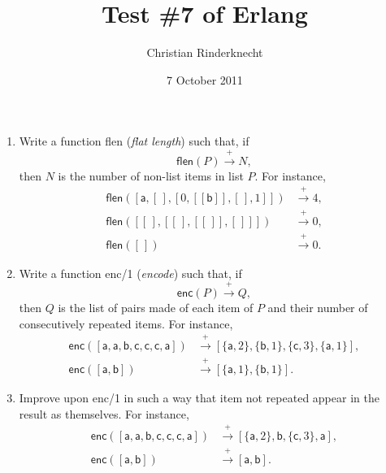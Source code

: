 \documentclass[11pt,a4paper]{article}
\title{Test \#7 of \textsf{Erlang}}
\author{Christian Rinderknecht}
\date{7 October 2011}
\newcommand\fun[1]{\textsf{#1}}
\begin{document}
\maketitle

\thispagestyle{empty}


\begin{enumerate}

  \item Write a function \fun{flen} (\emph{flat length}) such that, if
    \[\fun{flen}(P) \xrightarrow{+} N,\]
    then \(N\) is the number of non-list items in list \(P\). For
    instance,
    \begin{align*}
    \fun{flen}([\fun{a},[\,],[0,[[\fun{b}]],[\,],1]])
    &\xrightarrow{+} 4,\\
    \fun{flen}([[\,],[[\,],[[\,]],[\,]]]) &\xrightarrow{+} 0,\\
    \fun{flen}([\,]) &\xrightarrow{+} 0.
    \end{align*}

  \item Write a function \fun{enc/1} (\emph{encode}) such that, if
    \[\fun{enc}(P) \xrightarrow{+} Q,\] then \(Q\) is the list of
    pairs made of each item of \(P\) and their number of consecutively
    repeated items. For instance,
    \begin{align*}
      \fun{enc}([\fun{a}, \fun{a}, \fun{b}, \fun{c}, \fun{c}, \fun{c},
        \fun{a}]) &\xrightarrow{+} [\{\fun{a},2\}, \{\fun{b},1\},
        \{\fun{c},3\}, \{\fun{a},1\}],\\
      \fun{enc}([\fun{a},\fun{b}]) &\xrightarrow{+} [\{\fun{a},1\},
        \{\fun{b},1\}].
    \end{align*}

  \item Improve upon \fun{enc/1} in such a way that item not repeated
    appear in the result as themselves. For instance,
    \begin{align*}
      \fun{enc}([\fun{a}, \fun{a}, \fun{b}, \fun{c}, \fun{c}, \fun{c},
        \fun{a}]) &\xrightarrow{+} [\{\fun{a},2\}, \fun{b},
        \{\fun{c},3\}, \fun{a}],\\
      \fun{enc}([\fun{a},\fun{b}]) &\xrightarrow{+} [\fun{a},
        \fun{b}].
    \end{align*}

\end{enumerate}
\end{document}

